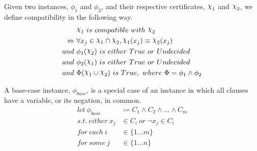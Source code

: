 \begin{definition}[Compatibility]
\label{def:compatibility}
    Given two instances, $\phi_1$ and $\phi_2$, and their respective certificates, $\rchi_1$ and $\rchi_2$, we define compatibility in the following way.
    \begin{align*}
        & \rchi_1~ is~ compatible~ with~ \rchi_2 \\
        \Leftrightarrow~ & \forall x_j \in \rchi_1 \cap \rchi_2, \rchi_1(x_j) \equiv \rchi_2(x_j) \\
        and~ & \phi_1(\rchi_2)~ is~ either~ True~ or~ Undecided \\
        and~ & \phi_2(\rchi_1)~ is~ either~ True~ or~ Undecided \\
        and~ & \Phi(\rchi_1 \cup \rchi_2)~ is~ True,~ where~ \Phi = \phi_1 \land \phi_2
    \end{align*}
\end{definition}

\begin{definition}
\label{def:base-case-instance}
    A base-case instance, $\phi_{base}$, is a special case of an instance in which all clauses have a variable, or its negation, in common.
    \begin{align*}
        let~ \phi_{base} & \coloneqq C_1 \land C_2 \land \ldots \land C_m \\
        s.t.~ either~ x_j & \in C_i~ or~ \lnot x_j \in C_i \\
        for~ each~ i & \in \{ 1 \dots m \} \\
        for~ some~ j & \in \{ 1 \dots n \}
    \end{align*}
\end{definition}

\begin{comment}
    Compatibility:
        Two certificates are compatible if there are no conflicts between their flattened versions.

    Applying a Certificate:
        Setting variables as per the certificate and following the resulting Cascade.

    Combining two certificates:
        Two certificates can be combined if they are compatible.
        The combined certificate is the union of assignments made by choice in either certificate.

\end{comment}
